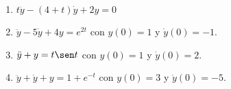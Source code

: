 \documentclass{article}
\begin{document}
\begin{enumerate}
        \item {
            $t\ddot y - (4 + t)\dot y + 2y = 0$

            \color{azul}
        }

        \item {
            $\ddot y - 5 \dot y + 4y = e^{2t}$ con $y(0) = 1$ y $\dot y(0) = -1$.

            \color{azul}
        }

        \item {
            $\ddot y + y = t\sen t$ con $y(0) = 1$ y  $\dot y(0) = 2$.

            \color{azul}
        }

        \item {
            $\ddot y + \dot y + y = 1 + e^{-t}$ con $y(0) = 3$ y $\dot y(0) = -5$.

            \color{azul}
        }
    \end{enumerate}
\end{document}
